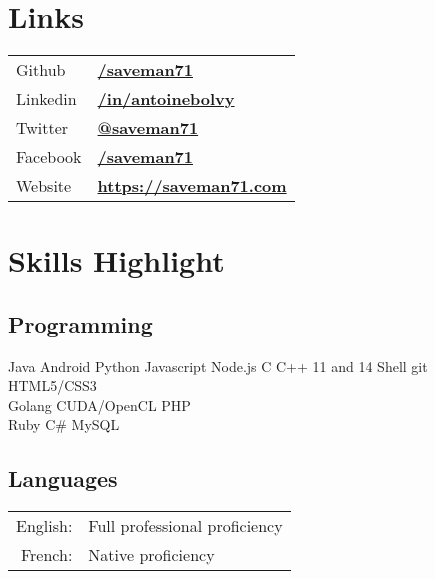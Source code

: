 \documentclass[]{resume-openfont}
\begin{document}
\begin{minipage}[t]{0.31\textwidth}
\section{Links}
\begin{tabular}{@{}l@{\hskip 0.5em}l}
Github & \href{https://github.com/saveman71}{\bf /saveman71} \\
Linkedin & \href{https://www.linkedin.com/in/antoinebolvy}{\bf /in/antoinebolvy} \\
Twitter & \href{https://twitter.com/saveman71}{\bf @saveman71} \\
Facebook & \href{https://facebook.com/saveman71}{\bf /saveman71} \\
Website & \href{https://saveman71.com}{\bf https://saveman71.com} \\
\end{tabular}
\sectionsep


\section{Skills Highlight}
\subsection{Programming}
\vspace{2pt}
Java \textbullet{} Android \textbullet{} Python \textbullet{} Javascript \textbullet{} Node.js \textbullet{} C \textbullet{} C++ 11 and 14 \textbullet{} Shell \textbullet{}  \textbullet{} git \textbullet{} HTML5/CSS3\\
\vspace{2pt}%
Golang \textbullet{} CUDA/OpenCL \textbullet{} PHP\\
\vspace{2pt}%
Ruby \textbullet{} C\# \textbullet{} MySQL
\sectionsep

\subsection{Languages}
\vspace{2pt}
\begin{tabular}{@{}r@{\hskip 0.5em}l}
English: &Full professional proficiency \\
French: &Native proficiency
\end{tabular}
\sectionsep


\end{minipage}
\end{document}
